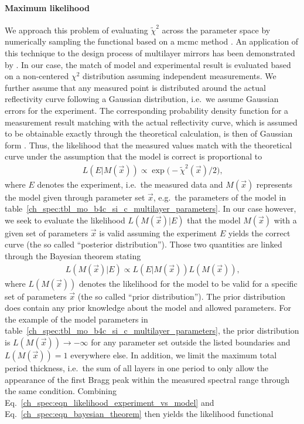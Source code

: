 \paragraph{Maximum likelihood}
We approach this problem of evaluating $\tilde{\chi}^2$ across the parameter space by numerically sampling the functional based on a \gls{mcmc} method \cite{goodman_ensemble_2010}. An application of this technique to the design process of multilayer mirrors has been demonstrated by \textcite{hobson_markov-chain_2004}. In our case, the match of model and experimental result is evaluated based on a non-centered $\chi^2$ distribution assuming independent measurements. We further assume that any measured point is distributed around the actual reflectivity curve following a Gaussian distribution, i.e.~we assume Gaussian errors for the experiment. The corresponding probability density function for a measurement result matching with the actual reflectivity curve, which is assumed to be obtainable exactly through the theoretical calculation, is then of Gaussian form \cite{abramowitz_handbook_1964}. Thus, the likelihood that the measured values match with the theoretical curve under the assumption that the model is correct is proportional to
\begin{align}
 L(E | M(\vec{x})) \propto \exp \big(- \tilde{\chi}^2(\vec{x}) / 2 \big) \text{,} \label{ch_spec:eqn_likelihood_experiment_vs_model}
\end{align}
where $E$ denotes the experiment, i.e.~the measured data and $M(\vec{x})$ represents the model given through parameter set $\vec{x}$, e.g.~the parameters of the model in table~\ref{ch_spec:tbl_mo_b4c_si_c_multilayer_parameters}. In our case however, we seek to evaluate the likelihood $L(M(\vec{x}) | E)$ that the model $M(\vec{x})$ with a given set of parameters $\vec{x}$ is valid assuming the experiment $E$ yields the correct curve (the so called ``posterior distribution''). Those two quantities are linked through the Bayesian theorem \cite{bayes_essay_1763, milton_introduction_2002} stating
\begin{align}
 L(M(\vec{x}) | E) \propto L(E | M(\vec{x})) L(M(\vec{x})) \text{,} \label{ch_spec:eqn_bayesian_theorem}
\end{align}
where $L(M(\vec{x}))$ denotes the likelihood for the model to be valid for a specific set of parameters $\vec{x}$ (the so called ``prior distribution''). The prior distribution does contain any prior knowledge about the model and allowed parameters. For the example of the model parameters in table~\ref{ch_spec:tbl_mo_b4c_si_c_multilayer_parameters}, the prior distribution is $L(M(\vec{x})) \rightarrow -\infty$ for any parameter set outside the listed boundaries and $L(M(\vec{x})) = 1$ everywhere else. In addition, we limit the maximum total period thickness, i.e.~the sum of all layers in one period to only allow the appearance of the first Bragg peak within the measured spectral range through the same condition. Combining Eq.~\eqref{ch_spec:eqn_likelihood_experiment_vs_model} and Eq.~\eqref{ch_spec:eqn_bayesian_theorem} then yields the likelihood functional
